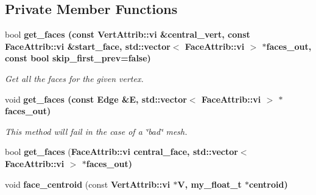 \subsection*{Private Member Functions}
\begin{CompactItemize}
\item 
bool \bf{get\_\-faces} (const \bf{Vert\-Attrib::vi} \&central\_\-vert, const \bf{Face\-Attrib::vi} \&start\_\-face, std::vector$<$ \bf{Face\-Attrib::vi} $>$ $\ast$faces\_\-out, const bool skip\_\-first\_\-prev=false)
\begin{CompactList}\small\item\em Get all the faces for the given vertex. \item\end{CompactList}\item 
void \bf{get\_\-faces} (const Edge \&E, std::vector$<$ \bf{Face\-Attrib::vi} $>$ $\ast$faces\_\-out)\label{classASCbase_1_1geometry_1_1SimpleTrimeshThree_b02e426e7faeba41f1b1814692130246}

\begin{CompactList}\small\item\em This method will fail in the case of a \char`\"{}bad\char`\"{} mesh. \item\end{CompactList}\item 
bool \textbf{get\_\-faces} (\bf{Face\-Attrib::vi} central\_\-face, std::vector$<$ \bf{Face\-Attrib::vi} $>$ $\ast$faces\_\-out)\label{classASCbase_1_1geometry_1_1SimpleTrimeshThree_365bd9e32896d3f3601714a2111cfbe9}

\item 
void \textbf{face\_\-centroid} (const \bf{Vert\-Attrib::vi} $\ast$V, my\_\-float\_\-t $\ast$centroid)\label{classASCbase_1_1geometry_1_1SimpleTrimeshThree_afdeeb98549efc087ee46a93a5bc4619}

\end{CompactItemize}
